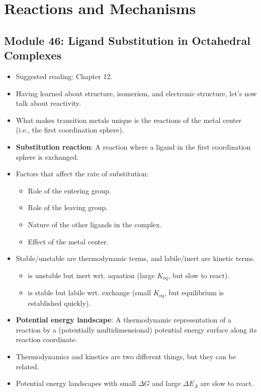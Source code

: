 \documentclass[../notes.tex]{subfiles}
\begin{document}
\chapter{Reactions and Mechanisms}
\section{Module 46: Ligand Substitution in Octahedral Complexes}
\begin{itemize}
    \item {}Suggested reading: Chapter 12.
    \item Having learned about structure, isomerism, and electronic structure, let's now talk about reactivity.
    \item What makes transition metals unique is the reactions of the metal center (i.e., the first coordination sphere).
    \item \textbf{Substitution reaction}: A reaction where a ligand in the first coordination sphere is exchanged.
    \item Factors that affect the rate of substitution:
    \begin{itemize}
        \item Role of the entering group.
        \item Role of the leaving group.
        \item Nature of the other ligands in the complex.
        \item Effect of the metal center.
    \end{itemize}
    \item Stable/unstable are thermodynamic terms, and labile/inert are kinetic terms.
    \begin{itemize}
        \item {} is unstable but inert wrt. aquation (large $K_\text{eq}$, but slow to react).
        \item {} is stable but labile wrt. exchange (small $K_\text{eq}$, but equilibrium is established quickly).
    \end{itemize}
    \item \textbf{Potential energy landscape}: A thermodynamic representation of a reaction by a (potentially multidimensional) potential energy surface along its reaction coordinate.
    \item Thermodynamics and kinetics are two different things, but they can be related.
    \item Potential energy landscapes with small $\Delta G$ and large $\Delta E_A$ are slow to react.

\end{itemize}
\end{document}
